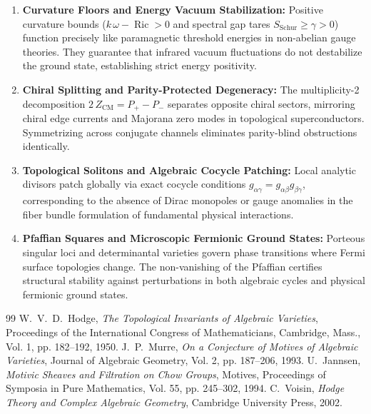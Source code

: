 \documentclass[11pt,a4paper]{article}
\theoremstyle{definition}
\begin{document}
\begin{enumerate}
  \item \textbf{Curvature Floors and Energy Vacuum Stabilization:} 
  Positive curvature bounds ($k\,\omega - \operatorname{Ric} > 0$ and spectral gap tares $S_{\mathrm{Schur}} \ge \gamma > 0$) function precisely like paramagnetic threshold energies in non-abelian gauge theories. They guarantee that infrared vacuum fluctuations do not destabilize the ground state, establishing strict energy positivity.
  
  \item \textbf{Chiral Splitting and Parity-Protected Degeneracy:} 
  The multiplicity-2 decomposition $2\,Z_{\mathrm{CM}} = P_+ - P_-$ separates opposite chiral sectors, mirroring chiral edge currents and Majorana zero modes in topological superconductors. Symmetrizing across conjugate channels eliminates parity-blind obstructions identically.
  
  \item \textbf{Topological Solitons and Algebraic Cocycle Patching:} 
  Local analytic divisors patch globally via exact cocycle conditions $g_{\alpha\gamma} = g_{\alpha\beta} g_{\beta\gamma}$, corresponding to the absence of Dirac monopoles or gauge anomalies in the fiber bundle formulation of fundamental physical interactions.
  
  \item \textbf{Pfaffian Squares and Microscopic Fermionic Ground States:} 
  Porteous singular loci and determinantal varieties govern phase transitions where Fermi surface topologies change. The non-vanishing of the Pfaffian certifies structural stability against perturbations in both algebraic cycles and physical fermionic ground states.
\end{enumerate}

\begin{thebibliography}{99}
 W.~V.~D.~Hodge, \emph{The Topological Invariants of Algebraic Varieties}, Proceedings of the International Congress of Mathematicians, Cambridge, Mass., Vol. 1, pp. 182--192, 1950.
 J.~P.~Murre, \emph{On a Conjecture of Motives of Algebraic Varieties}, Journal of Algebraic Geometry, Vol. 2, pp. 187--206, 1993.
 U.~Jannsen, \emph{Motivic Sheaves and Filtration on Chow Groups}, Motives, Proceedings of Symposia in Pure Mathematics, Vol. 55, pp. 245--302, 1994.
 C.~Voisin, \emph{Hodge Theory and Complex Algebraic Geometry}, Cambridge University Press, 2002.
\end{thebibliography}
\end{document}
